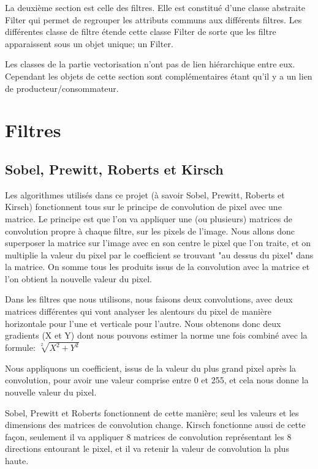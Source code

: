 \documentclass[twoside,openright,a4paper,11pt,french]{article}
\begin{document}
La deuxième section est celle des filtres. Elle est constitué d'une classe abstraite Filter qui permet de regrouper les
attributs communs aux différents filtres.
Les différentes classe de filtre étende cette classe Filter de sorte que les filtre apparaissent sous un objet unique; un Filter.

Les classes de la partie vectorisation n'ont pas de lien hiérarchique entre
eux. Cependant les objets de cette section sont complémentaires étant qu'il y a un lien de producteur/consommateur.


\section{Filtres}
\label{sec:filtres}

\subsection{Sobel, Prewitt, Roberts et Kirsch}
Les algorithmes utilisés dans ce projet (à savoir Sobel, Prewitt, Roberts et Kirsch)
fonctionnent tous sur le principe de convolution de pixel avec une matrice.
Le principe est que l'on va appliquer une (ou plusieurs) matrices de convolution propre
à chaque filtre, sur les pixels de l'image. Nous allons donc superposer la matrice sur
l'image avec en son centre le pixel que l'on traite, et on multiplie la valeur du pixel
par le coefficient se trouvant "au dessus du pixel" dans la matrice. On somme tous les
produits issus de la convolution avec la matrice et l'on obtient la nouvelle valeur du pixel.

Dans les filtres que nous utilisons, nous faisons deux convolutions, avec deux
matrices différentes qui vont analyser les alentours du pixel de manière
horizontale pour l'une et verticale pour l'autre. Nous obtenons donc deux
gradients (X et Y) dont nous pouvons estimer la norme une fois combiné avec la
formule:
$\sqrt[2]{X^2+Y^2}$

Nous appliquons un coefficient, issus de la valeur du plus grand pixel après la convolution,
pour avoir une valeur comprise entre 0 et 255, et cela nous donne la nouvelle valeur du pixel.

Sobel, Prewitt et Roberts fonctionnent de cette manière; seul les valeurs et
les dimensions des matrices de convolution change.
Kirsch fonctionne aussi de cette façon, seulement il va appliquer 8 matrices de convolution
représentant les 8 directions entourant le pixel, et il va retenir la valeur de convolution
la plus haute.
\end{document}
